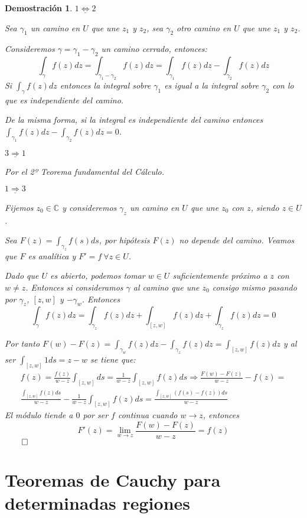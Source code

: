 \documentclass[10pt]{book}
\newtheorem*{dem}{Demostración}
\newcommand{\C}{\mathbb{C}}
\begin{document}
\begin{dem}
$\underline{1 \Leftrightarrow 2}$

Sea $\gamma_1$ un camino en $U$ que une $z_1$ y $z_2$, sea $\gamma_2$ otro camino en $U$ que une $z_1$ y $z_2$.

Consideremos $\gamma = \gamma_1 -\gamma_2$ un camino cerrado, entonces:
$$\int_\gamma f(z)dz = \int_{\gamma_1 -\gamma_2} f(z)dz = \int_{\gamma_1} f(z)dz - \int_{\gamma_2} f(z)dz$$
Si $\int_\gamma f(z)dz$ entonces la integral sobre $\gamma_1$ es igual a la integral sobre $\gamma_2$ con lo que es independiente del camino.

De la misma forma, si la integral es independiente del camino entonces $\displaystyle\int_{\gamma_1} f(z)dz - \int_{\gamma_2} f(z)dz = 0$.

$\underline{3 \Rightarrow 1}$

Por el 2º Teorema fundamental del Cálculo.

$\underline{1 \Rightarrow 3}$

Fijemos $z_0 \in \C$ y consideremos $\gamma_z$ un camino en $U$ que une $z_0$ con $z$, siendo $z \in U$.

Sea $F(z) = \int_{\gamma_z}f(s)ds$, por hipótesis $F(z)$ no depende del camino. Veamos que $F$ es analítica y $F'=f \ \forall z \in U$.

Dado que $U$ es abierto, podemos tomar $w\in U$ suficientemente próximo a $z$ con $w\neq z$. Entonces si consideramos $\gamma$ al camino que une $z_0$ consigo mismo pasando por $\gamma_z$, $[z,w]$ y $-\gamma_w$. Entonces
$$
\int_\gamma f(z)dz = \int_{\gamma_z} f(z)dz + \int_{[z,w]} f(z)dz + \int_{\gamma_z} f(z)dz = 0
$$ 

Por tanto $F(w)-F(z) = \int_{\gamma_w} f(z)dz - \int_{\gamma_z} f(z)dz = \int_{[z,w]} f(z)dz$ y al ser $\int_[z,w] 1ds = z-w$ se tiene que:
\begin{multline*}
f(z) = \frac{f(z)}{w-z}\int_{[z,w]}ds= \frac{1}{w-z}\int_{[z,w]}f(z)ds \Rightarrow \frac{F(w)-F(z)}{w-z}-f(z) =\\
\frac{\int_{[z,w]}f(z)ds}{w-z}-\frac{1}{w-z}\int_{[z,w]}f(z)ds = \frac{\int_{[z,w]}(f(s)-f(z))ds}{w-z}
\end{multline*}
El módulo tiende a $0$ por ser $f$ continua cuando $w \to z$, entonces 
$$F'(z) = \lim_{w\to z}\frac{F(w)-F(z)}{w-z} = f(z)$$
$\qed$

\end{dem}

\section{Teoremas de Cauchy para determinadas regiones}
\end{document}
